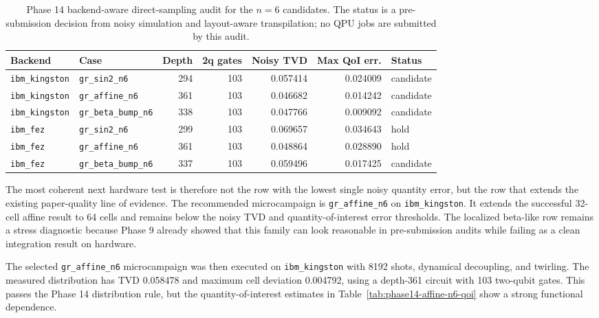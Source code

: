 \begin{table}[h]
\centering
\small
\begin{tabular}{llrrrrl}
\toprule
Backend & Case & Depth & 2q gates & Noisy TVD & Max QoI err. & Status \\
\midrule
\texttt{ibm\_kingston} & \texttt{gr\_sin2\_n6} & 294 & 103 & 0.057414 & 0.024009 & candidate \\
\texttt{ibm\_kingston} & \texttt{gr\_affine\_n6} & 361 & 103 & 0.046682 & 0.014242 & candidate \\
\texttt{ibm\_kingston} & \texttt{gr\_beta\_bump\_n6} & 338 & 103 & 0.047766 & 0.009092 & candidate \\
\texttt{ibm\_fez} & \texttt{gr\_sin2\_n6} & 299 & 103 & 0.069657 & 0.034643 & hold \\
\texttt{ibm\_fez} & \texttt{gr\_affine\_n6} & 361 & 103 & 0.048864 & 0.028890 & hold \\
\texttt{ibm\_fez} & \texttt{gr\_beta\_bump\_n6} & 337 & 103 & 0.059496 & 0.017425 & candidate \\
\bottomrule
\end{tabular}
\caption{Phase 14 backend-aware direct-sampling audit for the \(n=6\)
candidates. The status is a pre-submission decision from noisy simulation and
layout-aware transpilation; no QPU jobs are submitted by this audit.}
\label{tab:phase14-backend-scaling}
\end{table}

The most coherent next hardware test is therefore not the row with the lowest
single noisy quantity error, but the row that extends the existing
paper-quality line of evidence. The recommended microcampaign is
\texttt{gr\_affine\_n6} on \texttt{ibm\_kingston}. It extends the successful
32-cell affine result to 64 cells and remains below the noisy TVD and
quantity-of-interest error thresholds. The localized beta-like row remains a
stress diagnostic because Phase 9 already showed that this family can look
reasonable in pre-submission audits while failing as a clean integration result
on hardware.

The selected \texttt{gr\_affine\_n6} microcampaign was then executed on
\texttt{ibm\_kingston} with 8192 shots, dynamical decoupling, and twirling. The
measured distribution has TVD 0.058478 and maximum cell deviation 0.004792,
using a depth-361 circuit with 103 two-qubit gates. This passes the Phase 14
distribution rule, but the quantity-of-interest estimates in
Table~\ref{tab:phase14-affine-n6-qoi} show a strong functional dependence.

